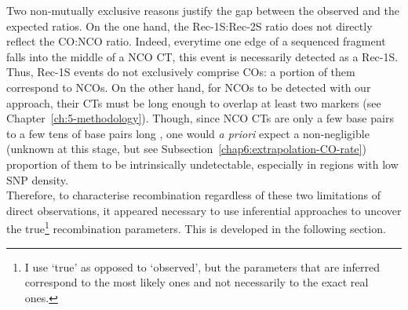 Two non-mutually exclusive reasons justify the gap between the observed and the expected ratios.
On the one hand, the Rec-1S:Rec-2S ratio does not directly reflect the CO:NCO ratio.
Indeed, everytime one edge of a sequenced fragment falls into the middle of a NCO CT, this event is necessarily detected as a Rec-1S. 
Thus, Rec-1S events do not exclusively comprise COs: a portion of them correspond to NCOs.
On the other hand, for NCOs to be detected with our approach, their CTs must be long enough to overlap at least two markers (see Chapter~\ref{ch:5-methodology}).
Though, since NCO CTs are only a few base pairs to a few tens of base pairs long \citep{cole2014mouse}, one would \textit{a priori} expect a non-negligible (unknown at this stage, but see Subsection~\ref{chap6:extrapolation-CO-rate}) proportion of them to be intrinsically undetectable, especially in regions with low SNP density.\\

Therefore, to characterise recombination regardless of these two limitations of direct observations, it appeared necessary to use inferential approaches to uncover the true\footnote{I use ‘true’ as opposed to ‘observed’, but the parameters that are inferred correspond to the most likely ones and not necessarily to the exact real ones.} recombination parameters. This is developed in the following section.







